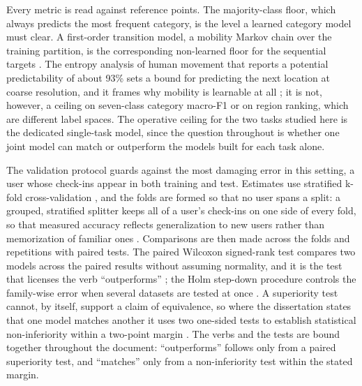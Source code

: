 Every metric is read against reference points. The majority-class floor, which always
predicts the most frequent category, is the level a learned category model must clear.
A first-order transition model, a mobility Markov chain over the training partition,
is the corresponding non-learned floor for the sequential targets \cite{gambs2012mmc}.
The entropy analysis of human movement that reports a potential predictability of about
93\% sets a bound for predicting the next location at coarse resolution, and it frames
why mobility is learnable at all \cite{song2010limits}; it is not, however, a ceiling on
seven-class category macro-F1 or on region ranking, which are different label spaces. The
operative ceiling for the two tasks studied here is the dedicated single-task model,
since the question throughout is whether one joint model can match or outperform the
models built for each task alone.

The validation protocol guards against the most damaging error in this setting, a user
whose check-ins appear in both training and test. Estimates use stratified k-fold
cross-validation \cite{kohavi1995crossval}, and the folds are formed so that no user
spans a split: a grouped, stratified splitter keeps all of a user's check-ins on one
side of every fold, so that measured accuracy reflects generalization to new users
rather than memorization of familiar ones \cite{pedregosa2011sklearn}. Comparisons
are then made across the folds and repetitions with paired tests. The paired Wilcoxon
signed-rank test compares two models across the paired results without assuming
normality, and it is the test that licenses the verb ``outperforms''
\cite{wilcoxon1945}; the Holm step-down procedure controls the family-wise error when
several datasets are tested at once \cite{holm1979}. A superiority test cannot, by
itself, support a claim of equivalence, so where the dissertation states that one
model matches another it uses two one-sided tests to establish statistical
non-inferiority within a two-point margin \cite{lakens2017tost}. The verbs and the
tests are bound together throughout the document: ``outperforms'' follows only from a
paired superiority test, and ``matches'' only from a non-inferiority test within the
stated margin.

